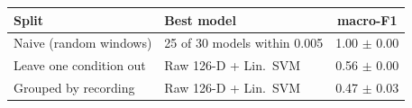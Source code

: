 \begin{tabular}{llc}
\toprule
Split & Best model & macro-F1 \\
\midrule
Naive (random windows) & 25 of 30 models within 0.005 & 1.00 $\pm$ 0.00 \\
Leave one condition out & Raw 126-D + Lin.\ SVM & 0.56 $\pm$ 0.00 \\
Grouped by recording & Raw 126-D + Lin.\ SVM & 0.47 $\pm$ 0.03 \\
\bottomrule
\end{tabular}
